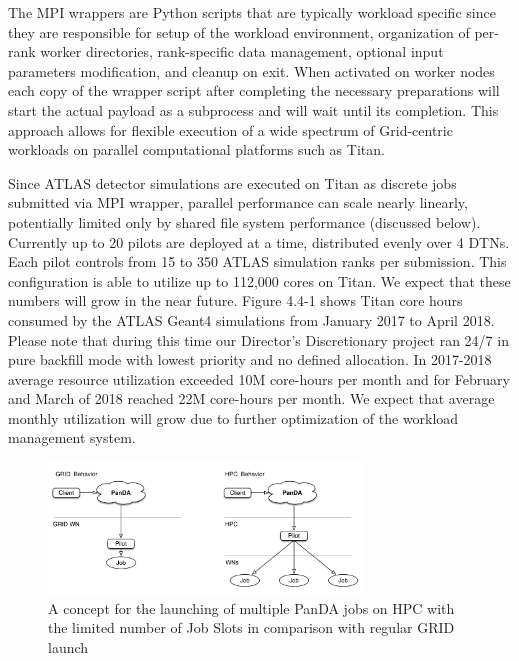 The MPI wrappers are Python scripts that are typically workload specific since
they are responsible for setup of the workload environment, organization of
per-rank worker directories, rank-specific data management, optional input
parameters modification, and cleanup on exit. When activated on worker nodes
each copy of the wrapper script after completing the necessary preparations
will start the actual payload as a subprocess and will wait until its
completion. This approach allows for flexible execution of a wide spectrum of
Grid-centric workloads on parallel computational platforms such as Titan.

Since ATLAS detector simulations are executed on Titan as discrete jobs
submitted via MPI wrapper, parallel performance can scale nearly linearly,
potentially limited only by shared file system performance (discussed below).
Currently up to 20 pilots are deployed at a time, distributed evenly over 4
DTNs. Each pilot controls from 15 to 350 ATLAS simulation ranks per submission.
This configuration is able to utilize up to 112,000 cores on Titan. We expect
that these numbers will grow in the near future.
Figure 4.4-1 shows Titan core hours consumed by the ATLAS Geant4 simulations
from January 2017 to April 2018. Please note that during this time our
Director's Discretionary project ran 24/7 in pure backfill mode with lowest
priority and no defined allocation. In 2017-2018 average resource utilization
exceeded 10M core-hours per month and for February and March of 2018 reached
22M core-hours per month. We expect that average monthly utilization will grow
due to further optimization of the workload management system.


\begin{figure}
  \includegraphics[width=0.75\textwidth]{images/Figure_3.png}
\caption{A concept for the launching of multiple PanDA jobs on HPC with the
limited number of Job Slots in comparison with regular GRID launch}
\label{fig:launching}
\end{figure}

